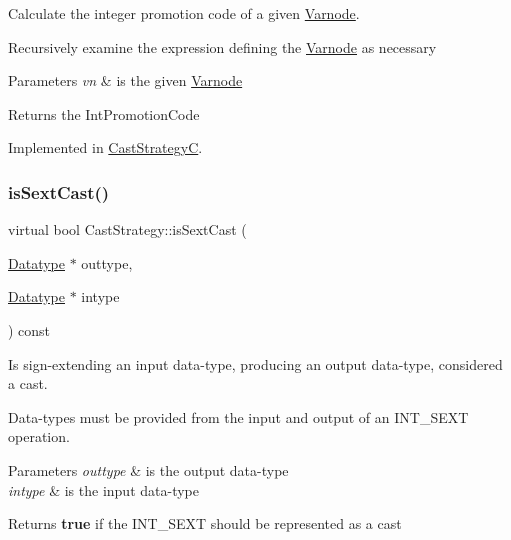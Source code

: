 Calculate the integer promotion code of a given \mbox{\hyperlink{class_varnode}{Varnode}}. 

Recursively examine the expression defining the \mbox{\hyperlink{class_varnode}{Varnode}} as necessary 
\begin{DoxyParams}{Parameters}
{\em vn} & is the given \mbox{\hyperlink{class_varnode}{Varnode}} \\
\hline
\end{DoxyParams}
\begin{DoxyReturn}{Returns}
the Int\+Promotion\+Code 
\end{DoxyReturn}


Implemented in \mbox{\hyperlink{class_cast_strategy_c_a628af1b296211f1cc9add47af576ea2b}{Cast\+StrategyC}}.

\mbox{\label{class_cast_strategy_a4c42bb2f8be16856a3c6ebbb1771aeaf}} 
\subsubsection{\texorpdfstring{isSextCast()}{isSextCast()}}
{\footnotesize\ttfamily virtual bool Cast\+Strategy\+::is\+Sext\+Cast (\begin{DoxyParamCaption}\item[{\mbox{\hyperlink{class_datatype}{Datatype}} $\ast$}]{outtype,  }\item[{\mbox{\hyperlink{class_datatype}{Datatype}} $\ast$}]{intype }\end{DoxyParamCaption}) const\hspace{0.3cm}{\ttfamily [pure virtual]}}



Is sign-\/extending an input data-\/type, producing an output data-\/type, considered a cast. 

Data-\/types must be provided from the input and output of an I\+N\+T\+\_\+\+S\+E\+XT operation. 
\begin{DoxyParams}{Parameters}
{\em outtype} & is the output data-\/type \\
\hline
{\em intype} & is the input data-\/type \\
\hline
\end{DoxyParams}
\begin{DoxyReturn}{Returns}
{\bfseries{true}} if the I\+N\+T\+\_\+\+S\+E\+XT should be represented as a cast 
\end{DoxyReturn}


